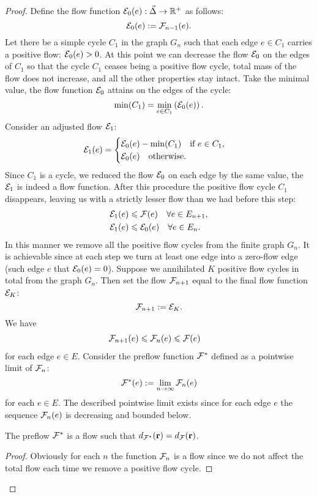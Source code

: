 \documentclass[12pt]{article}
\begin{document}
\begin{proof}
      Define the flow function $\cal{E}_0(e): \onet \to \mathbb{R}^{+}$ as follows:
      \[
        \cal{E}_0(e) := \flowposn{n-1}(e).
      \]
      Let there be a simple cycle $C_1$ in the graph $G_n$ such that each edge $e \in C_1$ carries
        a positive flow: $\cal{E}_0(e) > 0$.
      At this point we can decrease the flow $\cal{E}_0$ on the edges of $C_1$ so that the cycle $C_1$
        ceases being a positive flow cycle, total mass of the flow does not increase, and all the other properties stay intact.
      Take the minimal value, the flow function $\cal{E}_0$ attains on the edges of the cycle:
        \[
          \min(C_1) = \min_{e \in C_1}\left(\cal{E}_0(e)\right).
        \]
      Consider an adjusted flow $\cal{E}_1$:
      \begin{equation*}
        \cal{E}_1(e) =
        \begin{cases}
          \cal{E}_0(e) - \min(C_1) \quad \text{if } e \in C_1,\\
          \cal{E}_0(e) \quad \text{otherwise}.
        \end{cases}
      \end{equation*}
      Since $C_1$ is a cycle, we reduced the flow $\cal{E}_0$ on each edge by the same value,
        the $\cal{E}_1$ is indeed a flow function.
      After this procedure the positive flow cycle $C_1$ disappears,
        leaving us with a strictly lesser flow than we had before this step:
      \begin{align*}
        &\cal{E}_1(e) \leq \flowpos(e)  \quad \forall e \in E_{n+1},\\
        &\cal{E}_1(e) \leq \cal{E}_0(e) \quad \forall e \in E_n.
      \end{align*}
      In this manner we remove all the positive flow cycles from the finite graph $G_n$.
      It is achievable since at each step we turn at least one edge into a zero-flow edge (such edge $e$ that $\cal{E}_0(e) = 0$).
      Suppose we annihilated $K$ positive flow cycles in total from the graph $G_n$.
      Then set the flow $\flowposn{n+1}$ equal to the final flow function $\cal{E}_K$:
      \[
        \flowposn{n+1} := \cal{E}_K.
      \]
      We have
      \begin{align*}
        &\flowposn{n+1}(e) \leq \flowposn{n}(e) \leq \flowpos(e)
      \end{align*}
        for each edge $e \in E$.
      Consider the preflow function $\preflow$ defined as a pointwise limit of $\flowposn{n}$:
      \[
        \preflow(e) := \lim_{n \to \infty} \flowposn{n}(e)
      \]
        for each $e \in E$.
      The described pointwise limit exists since for each edge $e$ the sequence $\flowposn{n}(e)$ is decreasing and bounded below.
      \begin{prop}
        The preflow $\preflow$ is a flow such that $d_{\preflow}(\root) = d_{\flowpos}(\root)$.
      \end{prop}
      \begin{proof}
        Obviously for each $n$ the function $\flowposn{n}$ is a flow since we do not affect the total flow each time we remove a positive flow cycle.


\end{proof}
\end{proof}
\end{document}
